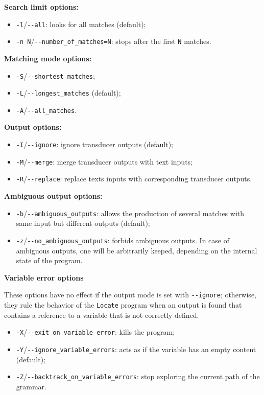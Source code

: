 \bigskip
\noindent \textbf{Search limit options:}
\begin{itemize}
  \item \verb+-l+/\verb+--all+: looks for all matches (default);
  \item \verb+-n N+/\verb+--number_of_matches=N+: stops after the first
  \verb+N+ matches.
\end{itemize}

\bigskip
\noindent \textbf{Matching mode options:}
\begin{itemize}
  \item \verb+-S+/\verb+--shortest_matches+;
  \item \verb+-L+/\verb+--longest_matches+ (default);
  \item \verb+-A+/\verb+--all_matches+.
\end{itemize}

\bigskip
\noindent \textbf{Output options:}
\begin{itemize}
  \item \verb+-I+/\verb+--ignore+: ignore transducer outputs (default);
  \item \verb+-M+/\verb+--merge+: merge transducer outputs with text inputs;
  \item \verb+-R+/\verb+--replace+: replace texts inputs with corresponding
  transducer outputs.
\end{itemize}

\bigskip
\noindent \textbf{Ambiguous output options:}
\begin{itemize}
  \item \verb+-b+/\verb+--ambiguous_outputs+: allows the production of several 
  matches with same input but different outputs (default);
  \item \verb+-z+/\verb+--no_ambiguous_outputs+: forbids ambiguous outputs. In
  case of ambiguous outputs, one will be arbitrarily keeped, depending on the
  internal state of the program.
\end{itemize}

\bigskip
\noindent \textbf{Variable error options}

\noindent These options have no effect if the output mode is set with
\verb+--ignore+; otherwise, they rule the behavior of the \verb+Locate+ program
when an output is found that contains a reference to a variable that is not correctly defined.
\begin{itemize}
  \item \verb+-X+/\verb+--exit_on_variable_error+: kills the program;
  \item \verb+-Y+/\verb+--ignore_variable_errors+: acts as if the variable has
  an empty content (default);
  \item \verb+-Z+/\verb+--backtrack_on_variable_errors+: stop exploring the
  current path of the grammar.
\end{itemize}
  


